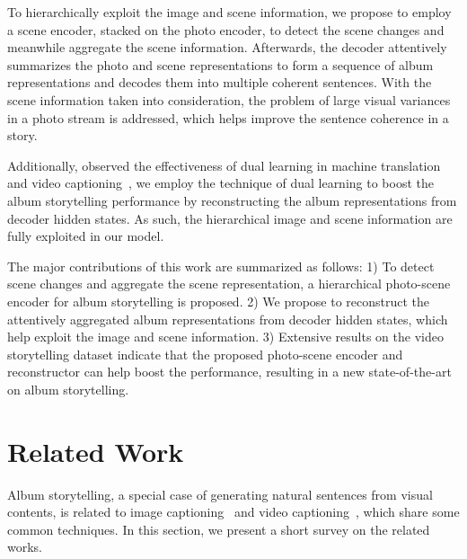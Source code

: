 \documentclass[letterpaper]{article} \usepackage{aaai19}  \usepackage{times}  \usepackage{helvet}  \usepackage{courier}  \usepackage{url}  \usepackage{graphicx}  \usepackage{color}
\begin{document}
To hierarchically exploit the image and scene information, we propose to employ a scene encoder, stacked on the photo encoder,  to detect the scene changes and meanwhile aggregate the scene information. Afterwards, the decoder attentively summarizes the photo and  scene representations to form a sequence of album representations and decodes them into multiple coherent sentences. With the scene information taken into consideration, the problem of large visual variances in a photo stream is addressed, which helps improve the sentence coherence in a story.


Additionally, observed the effectiveness of dual learning in machine translation~\cite{tu2017neural} and video captioning~\cite{wang2018reconstruction}, we employ the technique of dual learning to boost the album storytelling performance by
reconstructing the album representations from decoder hidden states.
As such, the hierarchical image and scene information are fully exploited in our model.


The major contributions of this work are summarized as follows:
1) To detect scene changes and aggregate the scene representation, a hierarchical photo-scene encoder for album storytelling is proposed.
2) We propose to reconstruct the attentively aggregated album representations from decoder hidden states, which help exploit the image and scene information. 3) Extensive results on the video storytelling dataset indicate that the proposed photo-scene encoder and reconstructor can help boost the performance, resulting in a new state-of-the-art on album storytelling.


\section{Related Work}

Album storytelling, a special case of generating natural sentences from visual contents, is related to image captioning~\cite{karpathy2014deep,ma2015multimodal,vinyals2015show,chen2018regularizing,jiang2018learning,jiang2018recurrent} and video captioning~\cite{pan2017video,wang2018reconstruction,wang2018bidirectional,chen2018temporally}, which share some common techniques. In this section, we present a short survey on the related works.
\end{document}
